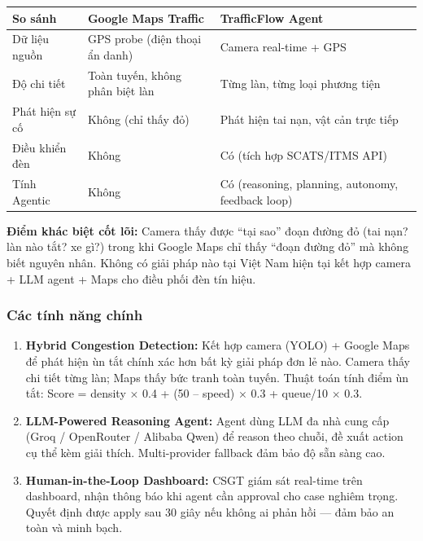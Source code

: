 \documentclass[12pt,a4paper]{article}
\begin{document}
\begin{table}[ht]
    \centering
    \begin{tabular}{|l|p{6cm}|p{6cm}|}
        \hline
        \textbf{So sánh} & \textbf{Google Maps Traffic} & \textbf{TrafficFlow Agent} \\
        \hline
        Dữ liệu nguồn & GPS probe (điện thoại ẩn danh) & Camera real-time + GPS \\
        \hline
        Độ chi tiết & Toàn tuyến, không phân biệt làn & Từng làn, từng loại phương tiện \\
        \hline
        Phát hiện sự cố & Không (chỉ thấy đỏ) & Phát hiện tai nạn, vật cản trực tiếp \\
        \hline
        Điều khiển đèn & Không & Có (tích hợp SCATS/ITMS API) \\
        \hline
        Tính Agentic & Không & Có (reasoning, planning, autonomy, feedback loop) \\
        \hline
    \end{tabular}
\end{table}

\textbf{Điểm khác biệt cốt lõi:} Camera thấy được ``tại sao'' đoạn đường đỏ (tai nạn? làn nào tắt? xe gì?) trong khi Google Maps chỉ thấy ``đoạn đường đỏ'' mà không biết nguyên nhân. Không có giải pháp nào tại Việt Nam hiện tại kết hợp camera + LLM agent + Maps cho điều phối đèn tín hiệu.

\subsubsection{Các tính năng chính}

\begin{enumerate}
    \item \textbf{Hybrid Congestion Detection:} Kết hợp camera (YOLO) + Google Maps để phát hiện ùn tắt chính xác hơn bất kỳ giải pháp đơn lẻ nào. Camera thấy chi tiết từng làn; Maps thấy bức tranh toàn tuyến. Thuật toán tính điểm ùn tắt: Score = density $\times$ 0.4 + (50 -- speed) $\times$ 0.3 + queue/10 $\times$ 0.3.

    \item \textbf{LLM-Powered Reasoning Agent:} Agent dùng LLM đa nhà cung cấp (Groq / OpenRouter / Alibaba Qwen) để reason theo chuỗi, đề xuất action cụ thể kèm giải thích. Multi-provider fallback đảm bảo độ sẵn sàng cao.

    \item \textbf{Human-in-the-Loop Dashboard:} CSGT giám sát real-time trên dashboard, nhận thông báo khi agent cần approval cho case nghiêm trọng. Quyết định được apply sau 30 giây nếu không ai phản hồi — đảm bảo an toàn và minh bạch.
\end{enumerate}
\end{document}
